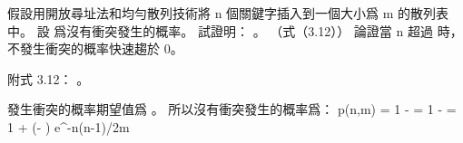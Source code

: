 \startsection[
  title={Perfect hashing},
  reference=section:perfect_hashing,
]

\startEXERCISE
假設用開放尋址法和均勻散列技術將 n 個關鍵字插入到一個大小爲 m 的散列表中。
設  爲沒有衝突發生的概率。
試證明： 。
（\hint 式（3.12））
論證當 n 超過  時，不發生衝突的概率快速趨於 0。

附式 3.12： 。
\stopEXERCISE

\startANSWER
發生衝突的概率期望值爲 。
所以沒有衝突發生的概率爲：
\startformula
p(n,m)
  = 1 - 
  = 1 - 
  = 1 + (- )
  \le e^{-n(n-1)/2m}
\stopformula

\stopANSWER

\stopsection
